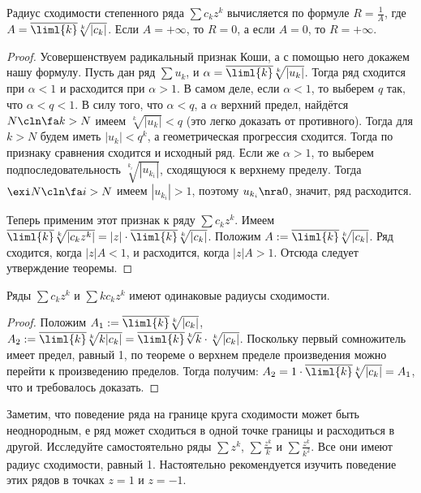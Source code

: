\documentclass[a4paper]{article}
\begin{document}
\begin{theorem}
Радиус сходимости степенного ряда $\sum c_k z^k$ вычисляется по формуле $R = \frac{1}{A}$, где
$A=\overline{\liml{k}} \sqrt[k]{|c_k|}$. Если $A = +\infty$, то $R = 0$, а если $A=0$, то $R = +\infty$.
\end{theorem}
\begin{proof}
Усовершенствуем радикальный признак Коши, а с помощью него докажем нашу формулу. Пусть дан ряд $\sum u_k$, и
$\alpha = \overline{\liml{k}}\sqrt[k]{|u_k|}$. Тогда ряд сходится при $\alpha < 1$ и расходится при $\alpha > 1$.
В самом деле, если $\alpha < 1$, то выберем $q$ так, что $\alpha < q < 1$. В силу того, что $\alpha < q$,
а $\alpha$ верхний предел, найдётся $N \cln \fa k > N$ имеем $\sqrt[k]{|u_k|} < q$ (это легко доказать от противного).
Тогда для $k > N$ будем иметь $|u_k| < q^k$, а геометрическая прогрессия сходится.
Тогда по признаку сравнения сходится и исходный ряд. Если же $\alpha > 1$, то выберем
подпоследовательность $\sqrt[k_i]{|u_{k_i}|}$, сходящуюся
к верхнему пределу. Тогда $\exi N \cln \fa i > N$ имеем $|u_{k_i}| > 1$, поэтому
$u_{k_i} \nra 0$, значит, ряд расходится.

Теперь применим этот признак к ряду $\sum c_k z^k$. Имеем
$\overline{\liml{k}}\sqrt[k]{|c_kz^k|}=|z|\cdot\overline{\liml{k}}\sqrt[k]{|c_k|}$.
Положим $A := \overline{\liml{k}}\sqrt[k]{|c_k|}$. Ряд сходится, когда $|z|A < 1$, и
расходится, когда $|z|A>1$. Отсюда следует утверждение теоремы.
\end{proof}

\begin{theorem}
Ряды $\sum c_k z^k$ и $\sum k c_kz^k$ имеют одинаковые радиусы сходимости.
\end{theorem}
\begin{proof}
Положим $A_1 := \overline{\liml{k}}\sqrt[k]{|c_k|}$, $A_2 := \overline{\liml{k}}\sqrt[k]{k|c_k|}=
\overline{\liml{k}}\sqrt[k]{k}\cdot\sqrt[k]{|c_k|}$. Поскольку первый сомножитель имеет
предел, равный 1, по теореме о верхнем пределе произведения
можно перейти к произведению пределов. Тогда получим:
$A_2 = 1 \cdot \overline{\liml{k}}\sqrt[k]{|c_k|} = A_1$, что и требовалось доказать.
\end{proof}

Заметим, что поведение ряда на границе круга сходимости может быть неоднородным, е ряд
может сходиться в одной точке границы и расходиться
в другой. Исследуйте самостоятельно ряды $\sum z^k$, $\sum \frac{z^k}{k}$ и $\sum \frac{z^k}{k^2}$. Все они
имеют радиус сходимости, равный 1. Настоятельно рекомендуется изучить поведение этих рядов в точках $z=1$ и $z=-1$.
\end{document}
